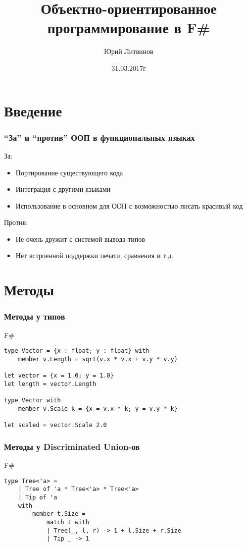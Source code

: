 \documentclass[xetex,mathserif,serif]{beamer}
\title{Объектно-ориентированное программирование в F\#}
\author{Юрий Литвинов}
\date{31.03.2017г}
\begin{document}
	
	\frame{\titlepage}
	
	\section{Введение}

	\begin{frame}
		\frametitle{``За'' и ``против'' ООП в функциональных языках}
		За:
		\begin{itemize}
    		\item Портирование существующего кода
    		\item Интеграция с другими языками
    		\item Использование в основном для ООП с возможностью писать красивый код
		\end{itemize}
		
		Против:
		\begin{itemize}
    		\item Не очень дружит с системой вывода типов
    		\item Нет встроенной поддержки печати, сравнения и т.д.
		\end{itemize}
	\end{frame}
	
	\section{Методы}
	
	\begin{frame}[fragile]
		\frametitle{Методы у типов}
		\begin{exampleblock}{F\#}
			\begin{verbatim}
type Vector = {x : float; y : float} with
    member v.Length = sqrt(v.x * v.x + v.y * v.y)

let vector = {x = 1.0; y = 1.0}
let length = vector.Length

type Vector with
    member v.Scale k = {x = v.x * k; y = v.y * k}

let scaled = vector.Scale 2.0
			\end{verbatim}
		\end{exampleblock}
\end{frame}

	\begin{frame}[fragile]
		\frametitle{Методы у Discriminated Union-ов}
		\begin{exampleblock}{F\#}
			\begin{verbatim}
type Tree<'a> =
    | Tree of 'a * Tree<'a> * Tree<'a>
    | Tip of 'a
    with
        member t.Size = 
            match t with
            | Tree(_, l, r) -> 1 + l.Size + r.Size
            | Tip _ -> 1
			\end{verbatim}
		\end{exampleblock}
\end{frame}
\end{document}
